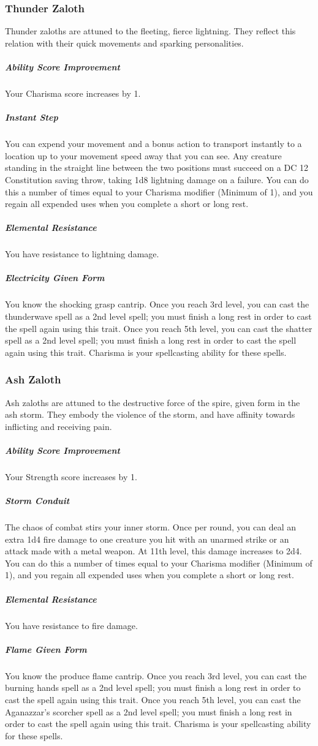\begin{linenumbers}
\subsubsection{Thunder Zaloth}
Thunder zaloths are attuned to the fleeting, fierce lightning.
They reflect this relation with their quick movements and sparking personalities.
\subparagraph{Ability Score Improvement} Your Charisma score increases by 1.
\subparagraph{Instant Step} You can expend your movement and a bonus action to transport instantly to a location up to your movement speed away that you can see.
Any creature standing in the straight line between the two positions must succeed on a DC 12 Constitution saving throw, taking 1d8 lightning damage on a failure.
You can do this a number of times equal to your Charisma modifier (Minimum of 1), and you regain all expended uses when you complete a short or long rest.
\subparagraph{Elemental Resistance} You have resistance to lightning damage.
\subparagraph{Electricity Given Form} You know the shocking grasp cantrip.
Once you reach 3rd level, you can cast the thunderwave spell as a 2nd level spell; you must finish a long rest in order to cast the spell again using this trait.
Once you reach 5th level, you can cast the shatter spell as a 2nd level spell; you must finish a long rest in order to cast the spell again using this trait.
Charisma is your spellcasting ability for these spells.

\subsubsection{Ash Zaloth}
Ash zaloths are attuned to the destructive force of the spire, given form in the ash storm.
They embody the violence of the storm, and have affinity towards inflicting and receiving pain.
\subparagraph{Ability Score Improvement} Your Strength score increases by 1.
\subparagraph{Storm Conduit} The chaos of combat stirs your inner storm.
Once per round, you can deal an extra 1d4 fire damage to one creature you hit with an unarmed strike or an attack made with a metal weapon.
At 11th level, this damage increases to 2d4.
You can do this a number of times equal to your Charisma modifier (Minimum of 1), and you regain all expended uses when you complete a short or long rest.
\subparagraph{Elemental Resistance} You have resistance to fire damage.
\subparagraph{Flame Given Form} You know the produce flame cantrip.
Once you reach 3rd level, you can cast the burning hands spell as a 2nd level spell; you must finish a long rest in order to cast the spell again using this trait.
Once you reach 5th level, you can cast the Aganazzar's scorcher spell as a 2nd level spell; you must finish a long rest in order to cast the spell again using this trait.
Charisma is your spellcasting ability for these spells.


\end{linenumbers}
